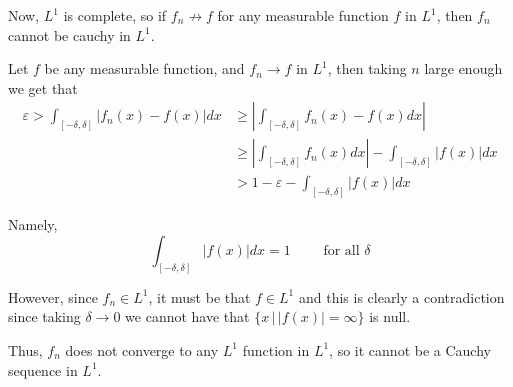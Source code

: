 \documentclass[12pt]{Qual}
\begin{document}
\begin{solution}
Now, $L^1$ is complete, so if $f_n\not\to f$ for any measurable function $f$ in $L^1$, then $f_n$ cannot be cauchy in $L^1.$

Let $f$ be any measurable function, and $f_n\to f$ in $L^1$, then taking $n$ large enough we get that  \begin{align*}
    \varepsilon>\int_{[-\delta,\delta]}|f_n(x)-f(x)|dx&\ge\left|\int_{[-\delta,\delta]}f_n(x)-f(x)dx\right|\\
    &\ge\left|\int_{[-\delta,\delta]}f_n(x)dx\right|-\int_{[-\delta,\delta]}|f(x)|dx\\
    &>1-\varepsilon-\int_{[-\delta,\delta]}|f(x)|dx
\end{align*}

Namely, $$\int_{[-\delta,\delta]}|f(x)|dx=1\qquad\text{ for all }\delta$$

However, since $f_n\in L^1$, it must be that $f\in L^1$ and this is clearly a contradiction since taking $\delta\to0$ we cannot have that $\{x\,|\,|f(x)|=\infty\}$ is null.

Thus, $f_n$ does not converge to any $L^1$ function in $L^1$, so it cannot be a Cauchy sequence in $L^1.$
\end{solution}
\vspace{0.5cm}
\end{document}
